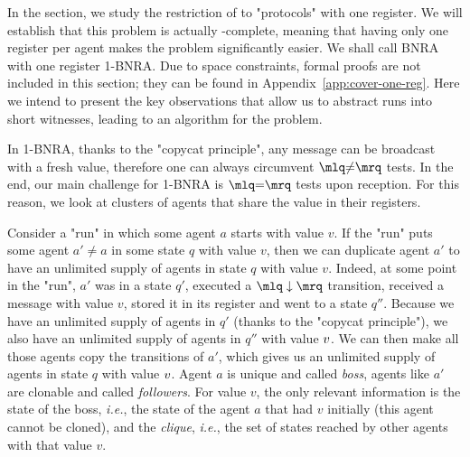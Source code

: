 In the section, we study the restriction of \COVER to "protocols" with one register. We will establish that this problem is actually \NP-complete, meaning that having only one register per agent makes the problem significantly easier. 
	We shall call BNRA with one register 1-BNRA. Due to space constraints, formal proofs are not included in this section; they can be found in Appendix~\ref{app:cover-one-reg}. Here we intend to present the key observations that allow us to abstract runs into short witnesses, leading to an \NP algorithm for the problem.
	
	In 1-BNRA, thanks to the "copycat principle", any  message can be broadcast with a fresh value, therefore one can always circumvent $\quotemarks{\diseqtestact}$ tests. In the end, our main challenge for 1-BNRA is $\quotemarks{\eqtestact}$ tests upon reception.
	For this reason, we look at clusters of agents that share the value in their registers. 

	Consider a "run" in which some agent $a$ starts with value $v$. 
	If the "run" puts some agent $a' \ne a$ in some state $q$ with value $v$, then we can duplicate agent $a'$ to have an unlimited supply of agents in state $q$ with value $v$. 
	Indeed, at some point in the "run", $a'$ was in a state $q'$, executed a $\quotemarks{\enregact}$ transition, received a message with value $v$, stored it in its register and went to a state $q''$. 
	Because we have an unlimited supply of agents in $q'$ (thanks to the "copycat principle"), we also have an unlimited supply of agents in $q''$ with value $v$. 
	We can then make all those agents copy the transitions of $a'$, which gives us an unlimited supply of agents in state $q$ with value $v$. Agent $a$ is unique and called \emph{boss}, agents like $a'$ are clonable and called \emph{followers}. For value $v$, the only relevant information is the state of the boss, \emph{i.e.}, the state of the agent $a$ that had $v$ initially (this agent cannot be cloned), and the \emph{clique}, \emph{i.e.}, the set of states reached by other agents with that value $v$. 

